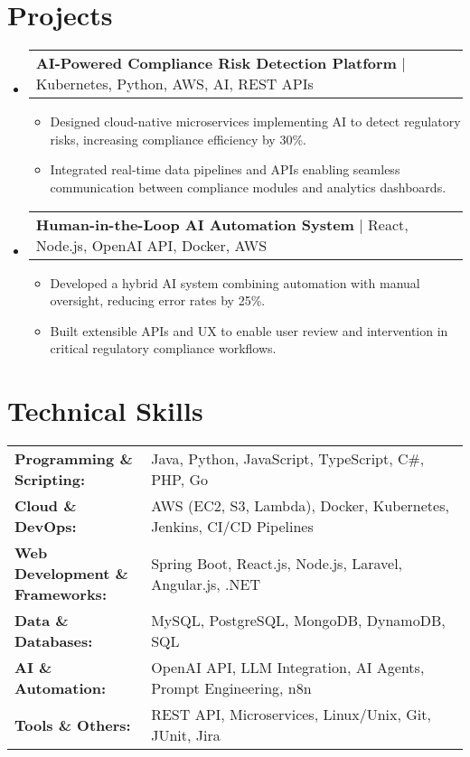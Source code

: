 \documentclass[letterpaper,11pt]{article}
\makeatletter
\newcommand{\resumeItem}[1]{
  \item\footnotesize{
    {#1 \vspace{-2pt}}
  }
}
\newcommand{\resumeProjectHeading}[2]{
    \item
    \begin{tabular*}{1.001\textwidth}{l@{\extracolsep{\fill}}r}
      \small#1 & \textbf{\small #2}\\
    \end{tabular*}\vspace{-7pt}
}
\newcommand{\resumeSubHeadingListStart}{\begin{itemize}[leftmargin=0pt, label={}]}
\newcommand{\resumeSubHeadingListEnd}{\end{itemize}}
\newcommand{\resumeItemListStart}{\begin{itemize}[leftmargin=*]}
\newcommand{\resumeItemListEnd}{\end{itemize}\vspace{-5pt}}
\makeatother
\begin{document}
\section{Projects}
    \vspace{-5pt}
    \resumeSubHeadingListStart
      \resumeProjectHeading
          {\textbf{AI-Powered Compliance Risk Detection Platform} | Kubernetes, Python, AWS, AI, REST APIs}{}
          \resumeItemListStart
              \resumeItem{Designed cloud-native microservices implementing AI to detect regulatory risks, increasing compliance efficiency by 30\%.}
              \resumeItem{Integrated real-time data pipelines and APIs enabling seamless communication between compliance modules and analytics dashboards.}
          \resumeItemListEnd
          \vspace{-16pt}
      \resumeProjectHeading
          {\textbf{Human-in-the-Loop AI Automation System} | React, Node.js, OpenAI API, Docker, AWS}{}
          \resumeItemListStart
              \resumeItem{Developed a hybrid AI system combining automation with manual oversight, reducing error rates by 25\%.}
              \resumeItem{Built extensible APIs and UX to enable user review and intervention in critical regulatory compliance workflows.}
          \resumeItemListEnd
          \vspace{-16pt}
    \resumeSubHeadingListEnd
\vspace{-10pt}
\section{Technical Skills}
        \vspace{-14pt}
        \begin{table}[h]
            \footnotesize
            \begin{tabular}{p{0.3\linewidth} p{0.7\linewidth}}
                \textbf{Programming \& Scripting:} & Java, Python, JavaScript, TypeScript, C\#, PHP, Go \\
                \textbf{Cloud \& DevOps:} & AWS (EC2, S3, Lambda), Docker, Kubernetes, Jenkins, CI/CD Pipelines \\
                \textbf{Web Development \& Frameworks:} & Spring Boot, React.js, Node.js, Laravel, Angular.js, .NET \\
                \textbf{Data \& Databases:} & MySQL, PostgreSQL, MongoDB, DynamoDB, SQL \\
                \textbf{AI \& Automation:} & OpenAI API, LLM Integration, AI Agents, Prompt Engineering, n8n \\
                \textbf{Tools \& Others:} & REST API, Microservices, Linux/Unix, Git, JUnit, Jira \\
            \end{tabular}
        \end{table}
\end{document}
